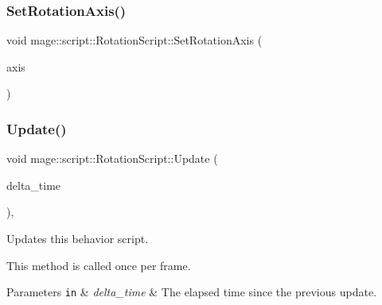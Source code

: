 \hypertarget{classmage_1_1script_1_1_rotation_script_aa4b49dc5e34da3e851d5aefc4c4a434b}{}\label{classmage_1_1script_1_1_rotation_script_aa4b49dc5e34da3e851d5aefc4c4a434b} 
\subsubsection{\texorpdfstring{Set\+Rotation\+Axis()}{SetRotationAxis()}}
{\footnotesize\ttfamily void mage\+::script\+::\+Rotation\+Script\+::\+Set\+Rotation\+Axis (\begin{DoxyParamCaption}\item[{\hyperlink{classmage_1_1script_1_1_rotation_script_a54e1d1d0af65f43f5bc5ad65a4b9c00a}{Rotation\+Axis}}]{axis }\end{DoxyParamCaption})\hspace{0.3cm}{\ttfamily [noexcept]}}

\hypertarget{classmage_1_1script_1_1_rotation_script_a868768482599b478e8fd8afe371b6c54}{}\label{classmage_1_1script_1_1_rotation_script_a868768482599b478e8fd8afe371b6c54} 
\subsubsection{\texorpdfstring{Update()}{Update()}}
{\footnotesize\ttfamily void mage\+::script\+::\+Rotation\+Script\+::\+Update (\begin{DoxyParamCaption}\item[{\mbox{[}\mbox{[}maybe\+\_\+unused\mbox{]} \mbox{]} \hyperlink{namespacemage_ad26233bbec640deda836e572c1a23708}{F64}}]{delta\+\_\+time }\end{DoxyParamCaption})\hspace{0.3cm}{\ttfamily [override]}, {\ttfamily [virtual]}}

Updates this behavior script.

This method is called once per frame.


\begin{DoxyParams}[1]{Parameters}
\mbox{\tt in}  & {\em delta\+\_\+time} & The elapsed time since the previous update. \\
\hline
\end{DoxyParams}

